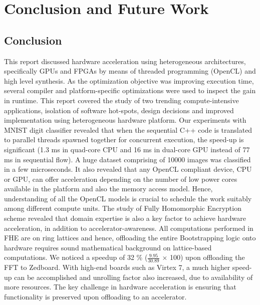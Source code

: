 \chapter{Conclusion and Future Work}
\label{ch5_conclusion}
\section{Conclusion}
\label{6_1}
This report discussed hardware acceleration using heterogeneous architectures, specifically GPUs and FPGAs by means of threaded programming (OpenCL) and high level synthesis. As the optimization objective was improving execution time, several compiler and platform-specific optimizations were used to inspect the gain in runtime. This report covered the study of two trending compute-intensive applications, isolation of software hot-spots, design decisions and improved implementation using heterogeneous hardware platform. \newline \newline Our experiments with MNIST digit classifier revealed that when the sequential C++ code is translated to parallel threads spawned together for concurrent execution, the speed-up is significant (1.3 ms in quad-core CPU and 16 ms in dual-core GPU instead of 77 ms in sequential flow). A huge dataset comprising of 10000 images was classified in a few microseconds. It also revealed that any OpenCL compliant device, CPU or GPU, can offer acceleration depending on the number of low power cores available in the platform and also the memory access model. Hence, understanding of all the OpenCL models is crucial to schedule the work suitably among different compute units. The study of Fully Homomorphic Encryption scheme revealed that domain expertise is also a key factor to achieve hardware acceleration, in addition to accelerator-awareness. All computations performed in FHE are on ring lattices and hence, offloading the entire Bootstrapping logic onto hardware requires sound mathematical background on lattice-based computations. We noticed a speedup of 32 \% ($\frac{9.95}{30.89}$ $\times$ 100) upon offloading the FFT to Zedboard. With high-end boards such as Virtex 7, a much higher speed-up can be accomplished and unrolling factor also increased, due to availability of more resources. The key challenge in hardware acceleration is ensuring that functionality is preserved upon offloading to an accelerator. 
